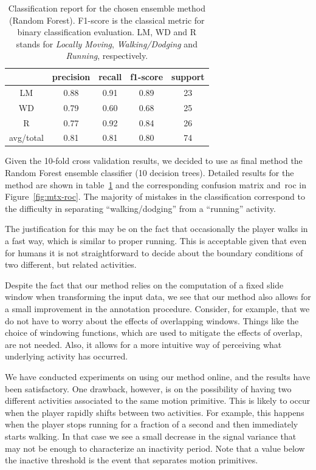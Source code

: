 \begin{table}[h]\footnotesize
  \centering
  \caption{Classification report for the chosen ensemble method (Random Forest). F1-score is the classical metric for binary classification evaluation. LM, WD and R stands for \textit{Locally Moving}, \textit{Walking/Dodging} and \textit{Running}, respectively. %
  }
  \begin{tabular}{| c | c | c | c | c |}
    \hline
  	   & precision   & recall & f1-score &  support \\\hline
    LM &      0.88   &  0.91  &    0.89  &      23  \\\hline
    WD &      0.79   &  0.60 &     0.68 &       25  \\\hline
     R &      0.77   &  0.92 &     0.84 &       26  \\\hline
avg/total &   0.81   &  0.81 &     0.80 &       74  \\\hline
  \end{tabular}
  \label{report}
\end{table}

Given the 10-fold cross validation results, we decided to use as final method the Random Forest ensemble classifier (10 decision trees). Detailed results for the method are shown in table~\ref{report} and the corresponding confusion matrix and~\gls{roc} in Figure~\ref{fig:mtx-roc}. The majority of mistakes in the classification correspond to the difficulty in separating ``walking/dodging'' from  a ``running'' activity. 

The justification for this may be on the fact that occasionally the player walks in a fast way, which is similar to proper running. This is acceptable given that even for humans it is not straightforward to decide about the boundary conditions of two different, but related activities.

Despite the fact that our method relies on the computation of a fixed slide window when transforming the input data, we see that our method also allows for a small improvement in the annotation procedure. Consider, for example, that we do not have to worry about the effects of overlapping windows. Things like the choice of windowing functions, which are used to mitigate the effects of overlap, are not needed. Also, it allows for a more intuitive way of perceiving what underlying activity has occurred.

We have conducted experiments on using our method online, and the results have been satisfactory. One drawback, however, is on the possibility of having two different activities associated to the same motion primitive. This is likely to occur when the player rapidly shifts between two activities. For example, this happens when the player stops running for a fraction of a second and then immediately starts walking. In that case we see a small decrease in the signal variance that may not be enough to characterize an inactivity period. Note that a value below the inactive threshold is the event that separates motion primitives.

